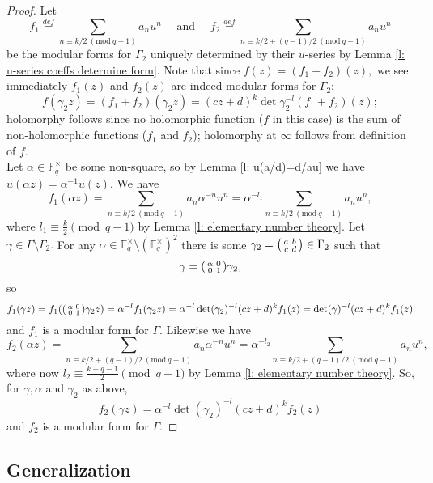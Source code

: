 \documentclass[11pt]{amsart}
\theoremstyle{definition}
\newenvironment{psmallmatrix}
{\left(\begin{smallmatrix}}
	{\end{smallmatrix}\right)}
\numberwithin{equation}{section}
\newcommand{\bbF}{\mathbb{F}}		%
\newcommand{\Mod}[1]{\ (\mathrm{mod}\ #1)}
\begin{document}
\begin{proof}
Let \[f_1\overset{def}{=}\sum_{n\equiv k/2\Mod{q-1}}a_nu^n\quad \text{ and }\quad f_2\overset{def}{=}\sum_{n\equiv k/2+(q-1)/2\Mod{q-1}} a_nu^n\] be the modular forms for $\Gamma_2$ uniquely determined by their $u$-series by Lemma \ref{l: u-series coeffs determine form}. Note that since $f(z)=(f_1+f_2)(z),$ we see immediately $f_1(z)$ and $f_2(z)$ are indeed modular forms for $\Gamma_2$: \[f(\gamma_2z)=(f_1+f_2)(\gamma_2 z)=(cz+d)^k\det\gamma_2^{-l}(f_1+f_2)(z);\] holomorphy follows since no holomorphic function ($f$ in this case) is the sum of non-holomorphic functions ($f_1$ and $f_2$); holomorphy at $\infty$ follows from definition of $f$.\\

Let $\alpha\in \bbF_q^{\times}$ be some non-square, so by Lemma \ref{l: u(a/d)=d/au} we have $u(\alpha z)=\alpha^{-1}u(z).$ We have \[f_1(\alpha z)=\sum_{n\equiv k/2\Mod{q-1}}a_n\alpha^{-n}u^n=\alpha^{-l_1}\sum_{n\equiv k/2\Mod{q-1}}a_nu^n,\] where $\displaystyle{l_1\equiv \frac{k}{2}\pmod{q-1}}$ by Lemma \ref{l: elementary number theory}. Let $\gamma\in \Gamma\setminus \Gamma_2.$ For any $\alpha\in \bbF_q^{\times}\setminus(\bbF_q^{\times})^2$ there is some $\displaystyle{\gamma_2=\begin{psmallmatrix}a&b\\c&d\end{psmallmatrix}\in \Gamma_2}$ such that \[\gamma=\begin{psmallmatrix}\alpha&0\\0&1\end{psmallmatrix}\gamma_2,\] so 
\[f_1(\gamma z)=f_1(\begin{psmallmatrix}\alpha&0\\0&1\end{psmallmatrix}\gamma_2 z)=\alpha^{-l}f_1(\gamma_2 z)=\alpha^{-l}\det(\gamma_2)^{-l}(cz+d)^kf_1(z)=\det(\gamma)^{-l}(cz+d)^kf_1(z)\] and $f_1$ is a modular form for $\Gamma.$ Likewise we have 
\[f_2(\alpha z)=\sum_{n\equiv k/2+(q-1)/2\Mod{q-1}} a_n\alpha^{-n}u^n=\alpha^{-l_2}\sum_{n\equiv k/2+(q-1)/2\Mod{q-1}} a_nu^n,\]
where now $\displaystyle{l_2\equiv \frac{k+q-1}{2}}\pmod{q-1}$ by Lemma \ref{l: elementary number theory}. So, for $\gamma,\alpha$ and $\gamma_2$ as above,
\[f_2(\gamma z)=\alpha^{-l}\det(\gamma_2)^{-l}(cz+d)^kf_2(z)\] and $f_2$ is a modular form for $\Gamma.$
\end{proof}


\subsection{Generalization}
\end{document}
